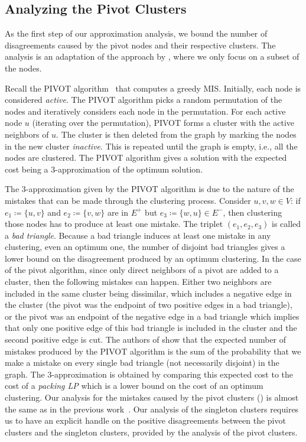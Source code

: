 \documentclass[10pt,a4paper]{article}
\newcommand{\pivot}{\textrm{PIVOT}\xspace}
\newcommand{\lp}{\textrm{LP}\xspace}
\begin{document}
\subsection{Analyzing the Pivot Clusters}\label{sec: pivot clusters}
As the first step of our approximation analysis, we bound the number of disagreements caused by the pivot nodes and their respective clusters.
The analysis is an adaptation of the approach by \cite{ailon2008aggregating}, where we only focus on a subset of the nodes.

Recall the \pivot algorithm~\cite{ailon2008aggregating} that computes a greedy MIS. 
Initially, each node is considered \emph{active}.
The \pivot algorithm picks a random permutation of the nodes and iteratively considers each node in the permutation. 
For each active node $u$ (iterating over the permutation), \pivot forms a cluster with the active neighbors of $u$. 
The cluster is then deleted from the graph by marking the nodes in the new cluster \emph{inactive}. 
This is repeated until the graph is empty, i.e., all the nodes are clustered. 
The \pivot algorithm gives a solution with the expected cost being a $3$-approximation of the optimum solution.

The $3$-approximation given by the \pivot algorithm is due to the nature of the mistakes that can be made through the clustering process.
Consider $u, v, w \in V$: if $e_1 \coloneqq \{u, v\}$ and $e_2 \coloneqq \{v, w\}$ are in $E^+$ but $e_3 \coloneqq \{w, u\}\in E^-$, then clustering those nodes has to produce at least one mistake. 
The triplet $(e_1, e_2, e_3)$ is called a \textit{bad triangle}. 
Because a bad triangle induces at least one mistake in any clustering, even an optimum one, the number of disjoint bad triangles gives a lower bound on the disagreement produced by an optimum clustering. 
In the case of the pivot algorithm, since only direct neighbors of a pivot are added to a cluster, then the following mistakes can happen. 
Either two neighbors are included in the same cluster being dissimilar, which includes a negative edge in the cluster (the pivot was the endpoint of two positive edges in a bad triangle), or the pivot was an endpoint of the negative edge in a bad triangle which implies that only one positive edge of this bad triangle is included in the cluster and the second positive edge is cut. 
The authors of \cite{ailon2008aggregating} show that the expected number of mistakes produced by the \pivot algorithm is the sum of the probability that we make a mistake on every single bad triangle (not necessarily disjoint) in the graph. 
The $3$-approximation is obtained by comparing this expected cost to the cost of a \emph{packing \lp} which is a lower bound on the cost of an optimum clustering.
Our analysis for the mistakes caused by the pivot clusters () is almost the same as in the previous work~\cite{ailon2008aggregating}. 
Our analysis of the singleton clusters requires us to have an explicit handle on the positive disagreements between the pivot clusters and the singleton clusters, provided by the analysis of the pivot clusters.
\end{document}
